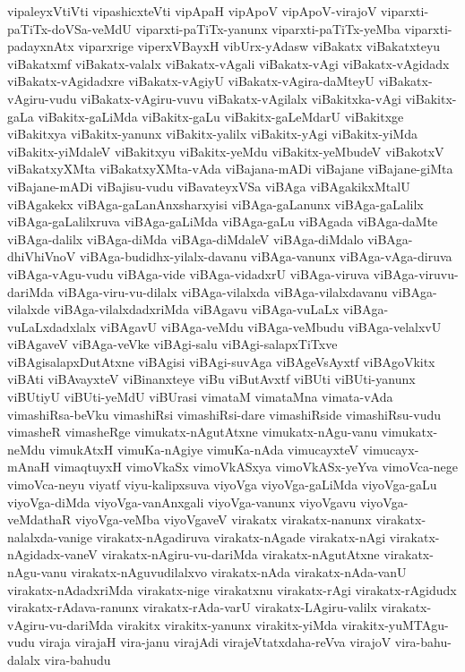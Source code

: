 {vipaleyxVtiVti
vipashicxteVti
vipApaH
vipApoV
vipApoV-virajoV
viparxti-paTiTx-doVSa-veMdU
viparxti-paTiTx-yanunx
viparxti-paTiTx-yeMba
viparxti-padayxnAtx
viparxrige
viperxVBayxH
vibUrx-yAdasw
viBakatx
viBakatxteyu
viBakatxmf
viBakatx-valalx
viBakatx-vAgali
viBakatx-vAgi
viBakatx-vAgidadx
viBakatx-vAgidadxre
viBakatx-vAgiyU
viBakatx-vAgira-daMteyU
viBakatx-vAgiru-vudu
viBakatx-vAgiru-vuvu
viBakatx-vAgilalx
viBakitxka-vAgi
viBakitx-gaLa
viBakitx-gaLiMda
viBakitx-gaLu
viBakitx-gaLeMdarU
viBakitxge
viBakitxya
viBakitx-yanunx
viBakitx-yalilx
viBakitx-yAgi
viBakitx-yiMda
viBakitx-yiMdaleV
viBakitxyu
viBakitx-yeMdu
viBakitx-yeMbudeV
viBakotxV
viBakatxyXMta
viBakatxyXMta-vAda
viBajana-mADi
viBajane
viBajane-giMta
viBajane-mADi
viBajisu-vudu
viBavateyxVSa
viBAga
viBAgakikxMtalU
viBAgakekx
viBAga-gaLanAnxsharxyisi
viBAga-gaLanunx
viBAga-gaLalilx
viBAga-gaLalilxruva
viBAga-gaLiMda
viBAga-gaLu
viBAgada
viBAga-daMte
viBAga-dalilx
viBAga-diMda
viBAga-diMdaleV
viBAga-diMdalo
viBAga-dhiVhiVnoV
viBAga-budidhx-yilalx-davanu
viBAga-vanunx
viBAga-vAga-diruva
viBAga-vAgu-vudu
viBAga-vide
viBAga-vidadxrU
viBAga-viruva
viBAga-viruvu-dariMda
viBAga-viru-vu-dilalx
viBAga-vilalxda
viBAga-vilalxdavanu
viBAga-vilalxde
viBAga-vilalxdadxriMda
viBAgavu
viBAga-vuLaLx
viBAga-vuLaLxdadxlalx
viBAgavU
viBAga-veMdu
viBAga-veMbudu
viBAga-velalxvU
viBAgaveV
viBAga-veVke
viBAgi-salu
viBAgi-salapxTiTxve
viBAgisalapxDutAtxne
viBAgisi
viBAgi-suvAga
viBAgeVsAyxtf
viBAgoVkitx
viBAti
viBAvayxteV
viBinanxteye
viBu
viButAvxtf
viBUti
viBUti-yanunx
viBUtiyU
viBUti-yeMdU
viBUrasi
vimataM
vimataMna
vimata-vAda
vimashiRsa-beVku
vimashiRsi
vimashiRsi-dare
vimashiRside
vimashiRsu-vudu
vimasheR
vimasheRge
vimukatx-nAgutAtxne
vimukatx-nAgu-vanu
vimukatx-neMdu
vimukAtxH
vimuKa-nAgiye
vimuKa-nAda
vimucayxteV
vimucayx-mAnaH
vimaqtuyxH
vimoVkaSx
vimoVkASxya
vimoVkASx-yeYva
vimoVca-nege
vimoVca-neyu
viyatf
viyu-kalipxsuva
viyoVga
viyoVga-gaLiMda
viyoVga-gaLu
viyoVga-diMda
viyoVga-vanAnxgali
viyoVga-vanunx
viyoVgavu
viyoVga-veMdathaR
viyoVga-veMba
viyoVgaveV
virakatx
virakatx-nanunx
virakatx-nalalxda-vanige
virakatx-nAgadiruva
virakatx-nAgade
virakatx-nAgi
virakatx-nAgidadx-vaneV
virakatx-nAgiru-vu-dariMda
virakatx-nAgutAtxne
virakatx-nAgu-vanu
virakatx-nAguvudilalxvo
virakatx-nAda
virakatx-nAda-vanU
virakatx-nAdadxriMda
virakatx-nige
virakatxnu
virakatx-rAgi
virakatx-rAgidudx
virakatx-rAdava-ranunx
virakatx-rAda-varU
virakatx-LAgiru-valilx
virakatx-vAgiru-vu-dariMda
virakitx
virakitx-yanunx
virakitx-yiMda
virakitx-yuMTAgu-vudu
viraja
virajaH
vira-janu
virajAdi
virajeVtatxdaha-reVva
virajoV
vira-bahu-dalalx
vira-bahudu
}
